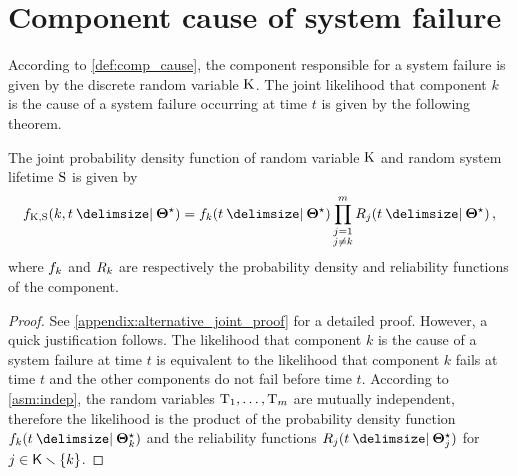 \documentclass[
    11pt,
    extrafontsizes,
    article,
    oldfontcommands,
    final,
    oneside,
    openany,
    hidelinks]{memoir}
\begin{document}
\section{Component cause of system failure}
\label{sec:joint_dist}
According to \cref{def:comp_cause}, the component responsible for a system failure is given by the discrete random variable $\mathrm{K}$. The joint likelihood that component $k$ is the cause of a system failure occurring at time $t$ is given by the following theorem.
\begin{theorem}
\label{thm:general_joint_density}
The joint probability density function of random variable $\mathrm{K}$ and random system lifetime $\mathrm{S}$ is given by
\begin{equation}
\label{eq:general_joint_density}
    \pdf_{\RV{K}, \sv}(k, t \Given \tparam{\sysparam}) = \pdf_k(t \Given \tparam\sysparam) \prod_{\substack{j=1\\j \neq k}}^{m} \srv_j(t \Given \tparam\sysparam)\,,
\end{equation}
where $f_k$ and $R_k$ are respectively the probability density and 
reliability functions of the \kth component.
\end{theorem}
\begin{proof}
See \cref{appendix:alternative_joint_proof} for a detailed proof. However, a 
quick justification follows. The likelihood that component $k$ is the cause of 
a system failure at time $t$ is equivalent to the likelihood that component $k$ 
fails at time $t$ and the other components do not fail before time $t$. 
According to \cref{asm:indep}, the random variables $\mathrm{T}_1, \ldots, \mathrm{T}_m$ are 
mutually independent, therefore the likelihood is the product of the 
probability density function $\pdf_k(t \Given \tparam{\sysparam}_k)$ and the 
reliability functions $\srv_j(t \Given \tparam{\sysparam}_j)$ for $j \in 
\SetDiff[\Set{K}][\{ k \}]$.
\end{proof}
\end{document}

